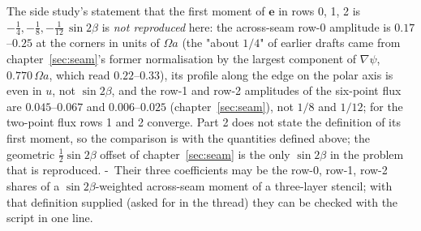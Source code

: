 The side study's statement that the first moment of $\bm e$ in rows 0, 1, 2 is $-\tfrac14,-\tfrac18,-\tfrac1{12}\,
\sin2\beta$ is \emph{not reproduced} here: the across-seam row-0 amplitude is $0.17$--$0.25$ at the corners in units of
$\Omega a$ (the "about $1/4$" of earlier drafts came from chapter~\ref{sec:seam}'s former normalisation by the largest
component of $\nabla\psi$, $0.770\,\Omega a$, which read $0.22$--$0.33$), its profile along the edge on the polar axis is even in $u$, not $\sin2\beta$, and the row-1 and row-2
amplitudes of the six-point flux are $0.045$--$0.067$ and $0.006$--$0.025$ (chapter~\ref{sec:seam}), not $1/8$ and
$1/12$; for the two-point flux rows 1 and 2 converge. Part 2 does not state the definition of its first moment, so the
comparison is with the quantities defined above; the geometric $\tfrac12\sin2\beta$ offset of chapter~\ref{sec:seam}
is the only $\sin2\beta$ in the problem that is reproduced. \hyp\ Their three coefficients may be the row-0, row-1,
row-2 shares of a $\sin2\beta$-weighted across-seam moment of a three-layer stencil; with that definition supplied
(asked for in the thread) they can be checked with the script in one line.
